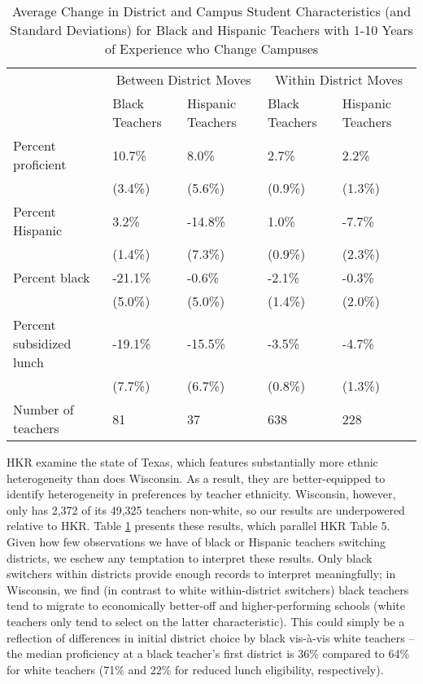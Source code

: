\documentclass[12pt,]{article}
\begin{document}
\begin{table}[htbp]
\centering
\begin{tabular}{lp{}p{}p{}p{}}
  \hline
 & \multicolumn{2}{c}{Between District Moves} & \multicolumn{2}{c}{Within District Moves}\\ \cline{2-5}
 & Black Teachers & Hispanic Teachers & Black Teachers & Hispanic Teachers \\
  \hline
Percent proficient & 10.7\% & 8.0\% & 2.7\% & 2.2\% \\ 
   & (3.4\%) & (5.6\%) & (0.9\%) & (1.3\%) \\ 
  Percent Hispanic & 3.2\% & -14.8\% & 1.0\% & -7.7\% \\ 
   & (1.4\%) & (7.3\%) & (0.9\%) & (2.3\%) \\ 
  Percent black & -21.1\% & -0.6\% & -2.1\% & -0.3\% \\ 
   & (5.0\%) & (5.0\%) & (1.4\%) & (2.0\%) \\ 
  Percent subsidized lunch & -19.1\% & -15.5\% & -3.5\% & -4.7\% \\ 
   & (7.7\%) & (6.7\%) & (0.8\%) & (1.3\%) \\ 
  Number of teachers & 81 & 37 & 638 & 228 \\ 
   \hline
\end{tabular}
\caption{Average Change in District and Campus Student Characteristics (and Standard Deviations) for Black and Hispanic Teachers with 1-10 Years of Experience who Change Campuses} 
\label{tbl:change_by_eth}
\end{table}

HKR examine the state of Texas, which features substantially more ethnic
heterogeneity than does Wisconsin. As a result, they are better-equipped
to identify heterogeneity in preferences by teacher ethnicity.
Wisconsin, however, only has 2,372 of its 49,325 teachers non-white, so
our results are underpowered relative to HKR. Table
\ref{tbl:change_by_eth} presents these results, which parallel HKR Table
5. Given how few observations we have of black or Hispanic teachers
switching districts, we eschew any temptation to interpret these
results. Only black switchers within districts provide enough records to
interpret meaningfully; in Wisconsin, we find (in contrast to white
within-district switchers) black teachers tend to migrate to
economically better-off and higher-performing schools (white teachers
only tend to select on the latter characteristic). This could simply be
a reflection of differences in initial district choice by black
vis-à-vis white teachers -- the median proficiency at a black teacher's
first district is 36\% compared to 64\% for white teachers (71\% and
22\% for reduced lunch eligibility, respectively).
\end{document}
